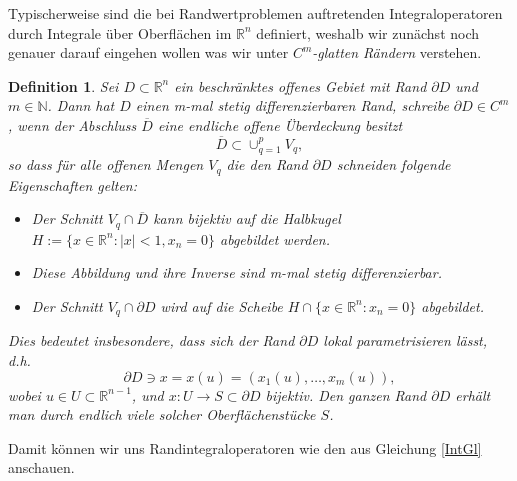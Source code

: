 \documentclass[12pt,a4paper]{scrartcl}
\newtheorem{Def}[Satz]{Definition}
\numberwithin{equation}{section}
\newcommand{\R}{\mathbb{R}} %
\newcommand{\N}{\mathbb{N}} %
\newcommand{\fa}{\text{\quad für alle }}
\begin{document}
Typischerweise sind die bei Randwertproblemen auftretenden Integraloperatoren durch Integrale über Oberflächen im $\R^n$ definiert, weshalb wir zunächst noch genauer darauf eingehen wollen was wir unter \emph{$C^m$-glatten Rändern} verstehen. 
\begin{Def} \label{Randpar}
Sei $D \subset \R^n$ ein beschränktes offenes Gebiet mit Rand $\partial D$ und $m \in \N$. Dann hat $D$ einen \emph{m-mal stetig differenzierbaren Rand}, schreibe $\partial D \in C^m$, wenn der Abschluss $\overline{D}$ eine endliche offene Überdeckung besitzt
\[
	\overline{D} \subset \cup_{q=1}^p V_q,
\]
so dass für alle offenen Mengen $V_q$ die den Rand $\partial D$ schneiden folgende Eigenschaften gelten:
\begin{itemize}
	\item Der Schnitt $V_q \cap \overline{D}$ kann bijektiv auf die Halbkugel $H:=\{x\in \R^n:|x|<1,x_n=0\}$ abgebildet werden.
	\item Diese Abbildung und ihre Inverse sind m-mal stetig differenzierbar.
	\item Der Schnitt $V_q \cap \partial D$ wird auf die Scheibe $H \cap \{x \in \R^n :x_n=0\}$ abgebildet.
\end{itemize}
Dies bedeutet insbesondere, dass sich der Rand $\partial D$ lokal parametrisieren lässt, d.h.
\[
	\partial D \ni x = x(u) = (x_1(u),\dots , x_m(u)),
\]
 wobei $u \in U \subset \R^{n-1}$, und $x:U \to S \subset \partial D$ bijektiv. Den ganzen Rand $\partial D$ erhält man durch endlich viele solcher Oberflächenstücke $S$.
\end{Def} 
Damit können wir uns Randintegraloperatoren wie den aus Gleichung \eqref{IntGl} anschauen. 

\end{document}

